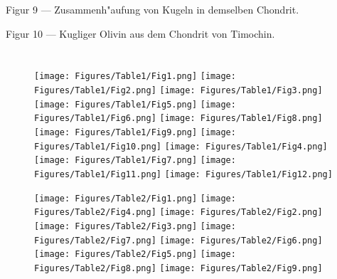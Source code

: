 \documentclass[a4paper, 11pt, oneside]{article}
\begin{document}
Figur 9 --- Zusammenh"aufung von Kugeln in demselben Chondrit.

Figur 10 --- Kugliger Olivin aus dem Chondrit von Timochin.
\section{}
\clearpage
\setlength\intextsep{0pt}
\pagestyle{fancy}
\fancyhf{}
\cfoot{\frakfamily{\thepage}}
\begin{figure}[p]
\texttt{[image: Figures/Table1/Fig1.png]}\tiny{}
\texttt{[image: Figures/Table1/Fig2.png]}\tiny{}
\texttt{[image: Figures/Table1/Fig3.png]}\tiny{}
\texttt{[image: Figures/Table1/Fig5.png]}\tiny{}
\tiny{}
\texttt{[image: Figures/Table1/Fig6.png]}
\texttt{[image: Figures/Table1/Fig8.png]}\tiny{}
\texttt{[image: Figures/Table1/Fig9.png]}\tiny{}
\texttt{[image: Figures/Table1/Fig10.png]}\tiny{}
\texttt{[image: Figures/Table1/Fig4.png]}\tiny{}
\texttt{[image: Figures/Table1/Fig7.png]}\tiny{}
\texttt{[image: Figures/Table1/Fig11.png]}\tiny{}
\texttt{[image: Figures/Table1/Fig12.png]}\tiny{}
\end{figure}
\clearpage
{}
\cfoot{\frakfamily{\thepage}}
\begin{figure}[p]
\tiny{}
\texttt{[image: Figures/Table2/Fig1.png]}
\texttt{[image: Figures/Table2/Fig4.png]}\tiny{}
\texttt{[image: Figures/Table2/Fig2.png]}\tiny{}
\texttt{[image: Figures/Table2/Fig3.png]}\tiny{}
\tiny{}
\texttt{[image: Figures/Table2/Fig7.png]}
\texttt{[image: Figures/Table2/Fig6.png]}\tiny{}
\texttt{[image: Figures/Table2/Fig5.png]}\tiny{}
\texttt{[image: Figures/Table2/Fig8.png]}\tiny{}
\texttt{[image: Figures/Table2/Fig9.png]}\tiny{}
\end{figure}
\end{document}
